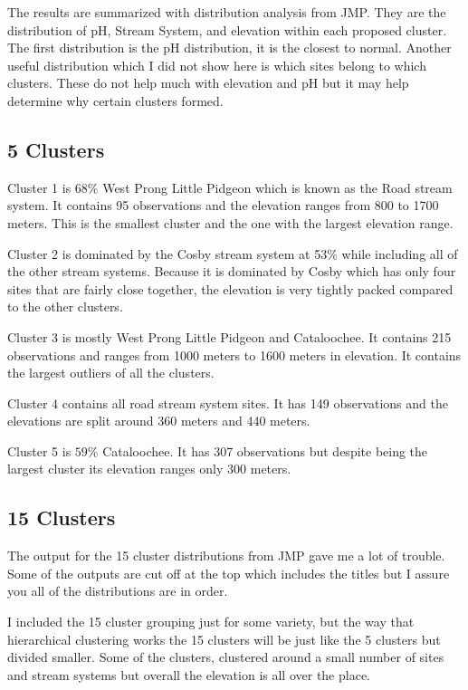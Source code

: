 \documentclass[11pt]{article} %
\begin{document}
The results are summarized with distribution analysis from JMP.  They are the distribution of pH, Stream System, and elevation within each proposed cluster.  The first distribution is the pH distribution, it is the closest to normal.  Another useful distribution which I did not show here is which sites belong to which clusters. These do not help much with elevation and pH but it may help determine why certain clusters formed.

\subsection{5 Clusters}
Cluster 1 is $68\%$ West Prong Little Pidgeon which is known as the Road stream system.  It contains 95 observations and the elevation ranges from 800 to 1700 meters.  This is the smallest cluster and the one with the largest elevation range.

Cluster 2 is dominated by the Cosby stream system at 53$\%$ while including all of the other stream systems.   Because it is dominated by Cosby which has only four sites that are fairly close together, the elevation is very tightly packed compared to the other clusters.

Cluster 3 is mostly West Prong Little Pidgeon and Cataloochee.  It contains 215 observations and ranges from 1000 meters to 1600 meters in elevation.  It contains the largest outliers of all the clusters.

Cluster 4 contains all road stream system sites.  It has 149 observations and the elevations are split around 360 meters and 440 meters.

Cluster 5 is $59\%$ Cataloochee.  It has 307 observations but despite being the largest cluster its elevation ranges only 300 meters.

\subsection{15 Clusters}
The output for the 15 cluster distributions from JMP gave me a lot of trouble.  Some of the outputs are cut off at the top which includes the titles but I assure you all of the distributions are in order.

I included the 15 cluster grouping just for some variety, but the way that hierarchical clustering works the 15 clusters will be just like the 5 clusters but divided smaller.  Some of the clusters, clustered around a small number of sites and stream systems but overall the elevation is all over the place.
\end{document}
